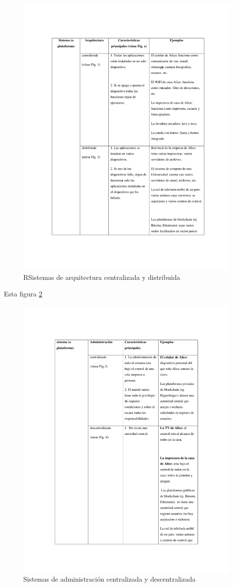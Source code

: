 \documentclass[12pt]{report} %
\begin{document}
\begin{itemize}
\begin{figure}
\centering
\includegraphics[width=0.85\columnwidth]{imagenes/imagendesc5.pdf}
\caption{RSistemas de arquitectura centralizada y distribuida}
\label{imagendesc5.pdf}
\end{figure} 

Esta figura \ref{imagendesc6}

\begin{figure}
\centering
\includegraphics[width=0.85\columnwidth]{imagenes/imagendesc6.pdf}
\caption{Sistemas de administración centralizada y descentralizada}
\label{imagendesc6}
\end{figure} 


\end{itemize}
\end{document}
